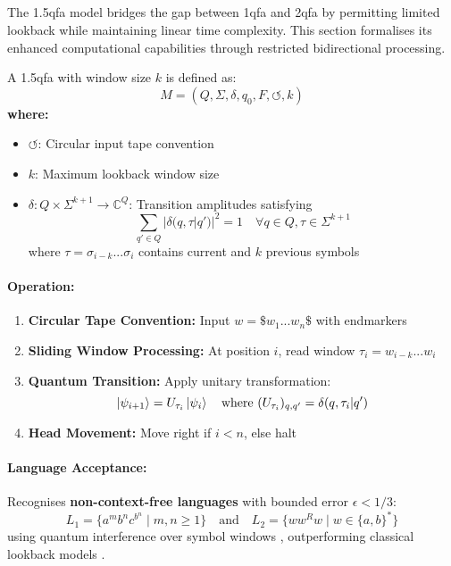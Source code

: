 \subsection{}
\label{sec:1.5qfa}
The \gls{1.5qfa} model bridges the gap between \gls{1qfa} and \gls{2qfa} by permitting limited lookback while maintaining linear time complexity. This section formalises its enhanced computational capabilities through restricted bidirectional processing.

\begin{definition}
A \gls{1.5qfa} with window size $k$ is defined as:
\[
M = (Q, \Sigma, \delta, q_0, F, \circlearrowleft, k)
\]
\textbf{where:}
\begin{itemize}
    \item $\circlearrowleft$: Circular input tape convention
    \item $k$: Maximum lookback window size
    \item $\delta: Q \times \Sigma^{k+1} \rightarrow \mathbb{C}^Q$: Transition amplitudes satisfying
    \[
    \sum_{q'\in Q} |\delta(q,\tau|q')|^2 = 1 \quad \forall q \in Q, \tau \in \Sigma^{k+1}
    \]
    where $\tau = \sigma_{i-k}...\sigma_i$ contains current and $k$ previous symbols
\end{itemize}
\end{definition}

\paragraph{Operation:}
\begin{enumerate}
    \item \textbf{Circular Tape Convention:} Input $w = \$w_1...w_n\$$ with endmarkers
    \item \textbf{Sliding Window Processing:} At position $i$, read window $\tau_i = w_{i-k}...w_i$
    \item \textbf{Quantum Transition:} Apply unitary transformation:
    \[
    \ket{\psi_{i+1}} = U_{\tau_i} \ket{\psi_i} \quad \text{where } (U_{\tau_i})_{q,q'} = \delta(q,\tau_i|q')
    \]
    \item \textbf{Head Movement:} Move right if $i < n$, else halt
\end{enumerate}

\paragraph{Language Acceptance:}
Recognises \textbf{non-context-free languages} with bounded error $\epsilon < 1/3$:
\[
L_1 = \{a^mb^nc^{b^n} \mid m,n \geq 1\} \quad \text{and} \quad L_2 = \{ww^Rw \mid w \in \{a,b\}^*\} 
\]
using quantum interference over symbol windows \cite{ambainis1998}, outperforming classical lookback models \cite{moore1971}.

